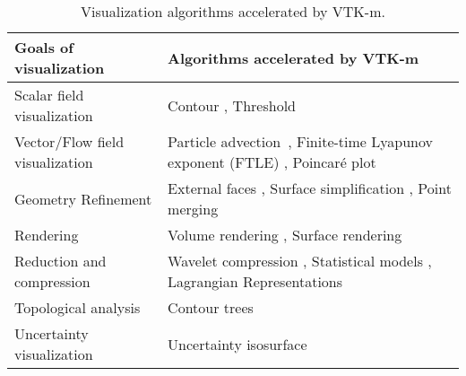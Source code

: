 \begin{table*}[htbp]
\caption{
Visualization algorithms accelerated by VTK-m.
}
\label{tab:algorithms}
\begin{tabularx}{\textwidth}{lX}
\toprule
    Goals of visualization & Algorithms accelerated by VTK-m\\
    \midrule
    Scalar field visualization & Contour \cite{Lo2012}, Threshold \cite{Maynard2013}  \\
    Vector/Flow field visualization & Particle advection~\cite{Pugmire2018}, Finite-time Lyapunov exponent (FTLE) \cite{Sane2021:EGPGV}, Poincar\'{e} plot~\cite{Suchyta2022}  \\
    Geometry Refinement & External faces \cite{Lessley2016,Lessley2017}, Surface simplification \cite{Moreland2016}, Point merging \cite{Yenpure2019} \\
    Rendering & Volume rendering \cite{Larsen2015:VR}, Surface rendering \cite{Larsen2015:RayTrace}  \\
    Reduction and compression &
    Wavelet compression \cite{Li2017}, Statistical models \cite{Wang2019},  Lagrangian Representations \cite{Sane2021:ICCS,Sane2021:EGPGV}  \\
    Topological analysis & Contour trees \cite{Carr2021}  \\
    Uncertainty visualization & Uncertainty isosurface \cite{Wang2023}  \\
\bottomrule
\end{tabularx}
\end{table*}

